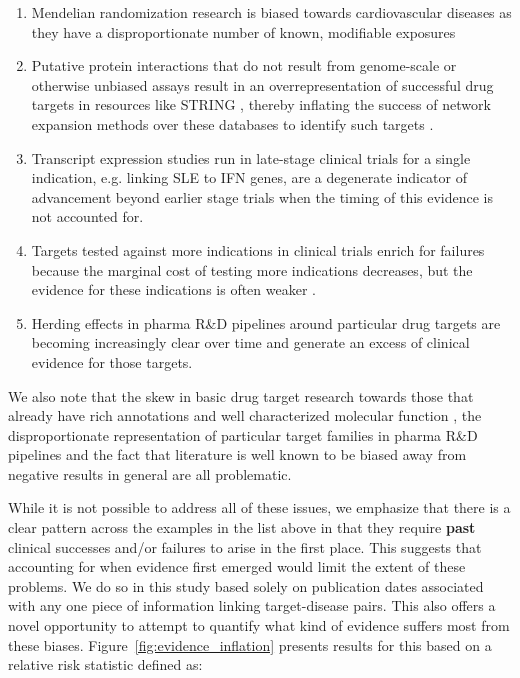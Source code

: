 \documentclass{article}
\begin{document}
\begin{enumerate}[topsep=0pt,itemsep=-1ex,partopsep=1ex,parsep=1ex]
\item Mendelian randomization research is biased towards cardiovascular diseases as they have a disproportionate number of known, modifiable exposures \cite{PMID:36736292}
\item Putative protein interactions that do not result from genome-scale or otherwise unbiased assays result in an overrepresentation of successful drug targets in resources like STRING \cite{PMID:36370105}, thereby inflating the success of network expansion methods over these databases to identify such targets \cite{Sadler2023-xd}.
\item Transcript expression studies run in late-stage clinical trials for a single indication, e.g. \cite{PMID:27723281} linking SLE to IFN genes, are a degenerate indicator of advancement beyond earlier stage trials when the timing of this evidence is not accounted for.
\item Targets tested against more indications in clinical trials enrich for failures because the marginal cost of testing more indications decreases, but the evidence for these indications is often weaker \cite{PMID:33262371}.
\item Herding effects in pharma R\&D pipelines around particular drug targets are becoming increasingly clear over time \cite{PMID:37117303} and generate an excess of clinical evidence for those targets.
\end{enumerate}

We also note that the skew in basic drug target research towards those that already have rich annotations and well characterized molecular function \cite{PMID:29358745}, the disproportionate representation of particular target families in pharma R\&D pipelines \cite{PMID:27910877,PPR:PPR7029} and the fact that literature is well known to be biased away from negative results in general \cite{PMID:32893970} are all problematic. 

While it is not possible to address all of these issues, we emphasize that there is a clear pattern across the examples in the list above in that they require \textbf{past} clinical successes and/or failures to arise in the first place. This suggests that accounting for when evidence first emerged would limit the extent of these problems. We do so in this study based solely on publication dates associated with any one piece of information linking target-disease pairs. This also offers a novel opportunity to attempt to quantify what kind of evidence suffers most from these biases. Figure~\ref{fig:evidence_inflation} presents results for this based on a relative risk statistic defined as:
\end{document}
